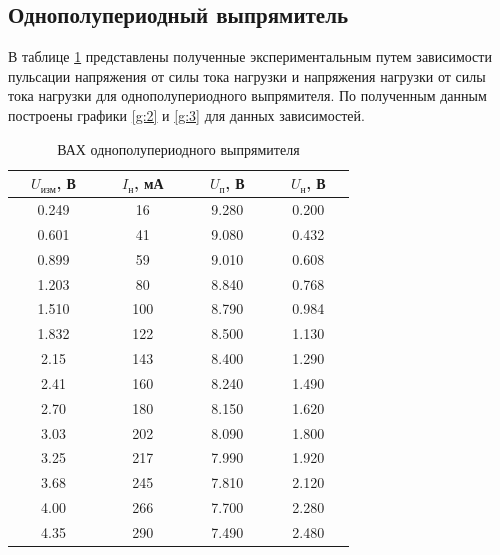 \subsection{Однополупериодный выпрямитель}

В таблице \ref{tab:5:2} представлены полученные экспериментальным путем зависимости пульсации напряжения от силы тока нагрузки и напряжения нагрузки от силы тока нагрузки для однополупериодного выпрямителя. По полученным данным построены графики \ref{g:2} и \ref{g:3} для данных зависимостей.

\begin{table}[H]
	\begin{center}
	\caption{ВАХ однополупериодного выпрямителя}
	\def\arraystretch{1.5}
		\begin{tabular}{|c|c|c|c|}
		\hline 
		\ \ $U_\text{изм}$, В\ \  & \ \ $I_\text{н}$, мА\ \  & \ \ $U_\text{п}$, В\ \  & \ \ $U_\text{н}$, В\ \  \\ \hline
		0.249 & 16 & 9.280 & 0.200 \\ \hline
		0.601 & 41 & 9.080 & 0.432 \\ \hline
		0.899 & 59 & 9.010 & 0.608 \\ \hline
		1.203 & 80 & 8.840 & 0.768 \\ \hline
		1.510 & 100 & 8.790 & 0.984 \\ \hline
		1.832 & 122 & 8.500 & 1.130 \\ \hline
		2.15 & 143 & 8.400 & 1.290 \\ \hline
		2.41 & 160 & 8.240 & 1.490 \\ \hline
		2.70 & 180 & 8.150 & 1.620 \\ \hline
		3.03 & 202 & 8.090 & 1.800 \\ \hline
		3.25 & 217 & 7.990 & 1.920 \\ \hline
		3.68 & 245 & 7.810 & 2.120 \\ \hline
		4.00 & 266 & 7.700 & 2.280 \\ \hline
		4.35 & 290 & 7.490 & 2.480 \\ \hline
		\end{tabular} 
		\label{tab:5:2}
	\end{center}
\end{table}

